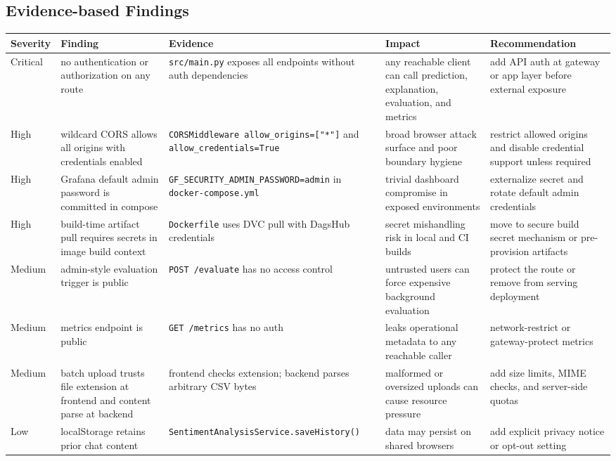 \subsection{Evidence-based Findings}
\begin{longtable}{@{}p{}p{}p{}p{}p{}@{}}
\toprule
\textbf{Severity} & \textbf{Finding} & \textbf{Evidence} & \textbf{Impact} & \textbf{Recommendation} \\
\midrule
\endhead
Critical & no authentication or authorization on any route & \texttt{src/main.py} exposes all endpoints without auth dependencies & any reachable client can call prediction, explanation, evaluation, and metrics & add API auth at gateway or app layer before external exposure \\
High & wildcard CORS allows all origins with credentials enabled & \texttt{CORSMiddleware allow\_origins=["*"]} and \texttt{allow\_credentials=True} & broad browser attack surface and poor boundary hygiene & restrict allowed origins and disable credential support unless required \\
High & Grafana default admin password is committed in compose & \texttt{GF\_SECURITY\_ADMIN\_PASSWORD=admin} in \texttt{docker-compose.yml} & trivial dashboard compromise in exposed environments & externalize secret and rotate default admin credentials \\
High & build-time artifact pull requires secrets in image build context & \texttt{Dockerfile} uses DVC pull with DagsHub credentials & secret mishandling risk in local and CI builds & move to secure build secret mechanism or pre-provision artifacts \\
Medium & admin-style evaluation trigger is public & \texttt{POST /evaluate} has no access control & untrusted users can force expensive background evaluation & protect the route or remove from serving deployment \\
Medium & metrics endpoint is public & \texttt{GET /metrics} has no auth & leaks operational metadata to any reachable caller & network-restrict or gateway-protect metrics \\
Medium & batch upload trusts file extension at frontend and content parse at backend & frontend checks extension; backend parses arbitrary CSV bytes & malformed or oversized uploads can cause resource pressure & add size limits, MIME checks, and server-side quotas \\
Low & localStorage retains prior chat content & \texttt{SentimentAnalysisService.saveHistory()} & data may persist on shared browsers & add explicit privacy notice or opt-out setting \\
\bottomrule
\end{longtable}

